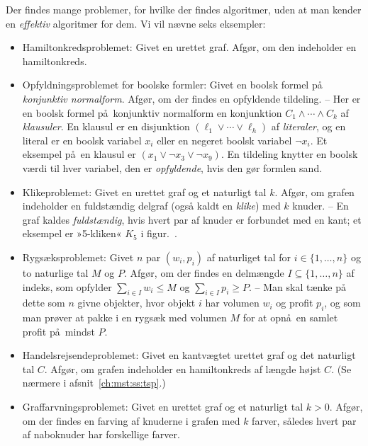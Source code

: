 Der findes mange problemer, for hvilke der findes algoritmer, uden at man kender en \emph{effektiv} algoritmer for dem.
Vi vil nævne seks eksempler:
\begin{itemize}
  \item Hamiltonkredsproblemet:
    Givet en urettet graf.
    Afgør, om den indeholder en hamiltonkreds.
  \item Opfyldningsproblemet for boolske formler:
    Givet en boolsk formel på \emph{konjunktiv normalform}. 
    Afgør, om der findes en opfyldende tildeling. --
    Her er en boolsk formel på konjunktiv normalform en konjunktion 
    $C_1 \wedge \cdots \wedge C_k$ af \emph{klausuler}. 
    En klausul er en disjunktion $(\ell_1 \vee \cdots \vee \ell_h)$ af \emph{literaler},
    og en literal er en boolsk variabel $x_i$ eller en negeret boolsk variabel $\neg x_i$.  
    Et eksempel på en klausul er $(x_1 \vee \neg x_3 \vee \neg x_9)$. 
    En tildeling knytter en boolsk værdi til hver variabel, den er \emph{opfyldende}, hvis den gør formlen sand.
  \item Klikeproblemet:
    Givet en urettet graf og et naturligt tal $k$.
    Afgør, om grafen indeholder en fuldstændig delgraf (også kaldt en \emph{klike}) med $k$ knuder.
    -- En graf kaldes \emph{fuldstændig}, hvis hvert par af knuder er forbundet med en kant;
    et eksempel er »5-kliken« $K_5$ i figur.~.
  \item Rygsæksproblemet:
    Givet $n$ par $(w_i,p_i)$  af naturliget tal for $i\in \{1,\ldots, n\}$ og to naturlige tal $M$ og $P$. 
    Afgør, om der findes en delmængde $I \subseteq \{1,\ldots, n\}$ af indeks, som opfylder 
    $\sum_{i \in I} w_i \le M$ og $\sum_{i \in I} p_i \ge P$.
    -- Man skal tænke på dette som $n$ givne objekter, hvor objekt $i$ har volumen $w_i$ og profit $p_i$, og som man prøver at pakke i en rygsæk med volumen $M$ for at opnå en samlet profit på mindst $P$.
  \item Handelsrejsendeproblemet:
    Givet en kantvægtet urettet graf og det naturligt tal $C$.
    Afgør, om grafen indeholder en hamiltonkreds af længde højst $C$.
    (Se nærmere i afsnit~\ref{ch:mst:ss:tsp}.)
  \item Graffarvningsproblemet:
    Givet en urettet graf og et naturligt tal $k>0$.
    Afgør, om der findes en farving af knuderne i grafen med $k$ farver, således hvert par af naboknuder har forskellige farver.
\end{itemize}
